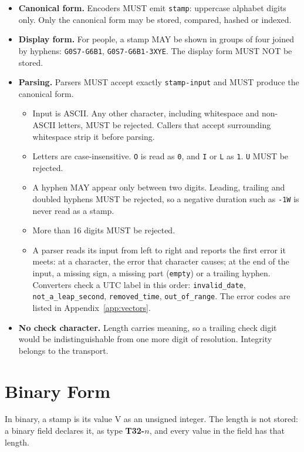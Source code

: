 \documentclass[11pt]{article}
\newcommand{\lit}[1]{\texttt{#1}}
\newcommand{\App}[1]{Appendix~\ref{#1}}
\begin{document}
\begin{itemize}
\item \textbf{Canonical form.} Encoders MUST emit \lit{stamp}: uppercase
alphabet digits only. Only the canonical form may be stored, compared, hashed
or indexed.
\item \textbf{Display form.} For people, a stamp MAY be shown in groups of
four joined by hyphens: \lit{G0S7-G6B1}, \lit{G0S7-G6B1-3XYE}. The display
form MUST NOT be stored.
\item \textbf{Parsing.} Parsers MUST accept exactly \lit{stamp-input} and MUST
produce the canonical form.
\begin{itemize}
\item Input is ASCII. Any other character, including whitespace and non-ASCII
letters, MUST be rejected. Callers that accept surrounding whitespace strip
it before parsing.
\item Letters are case-insensitive. \lit{O} is read as \lit{0}, and \lit{I} or
\lit{L} as \lit{1}. \lit{U} MUST be rejected.
\item A hyphen MAY appear only between two digits. Leading, trailing and
doubled hyphens MUST be rejected, so a negative duration such as \lit{-1W} is
never read as a stamp.
\item More than 16 digits MUST be rejected.
\item A parser reads its input from left to right and reports the first error
it meets: at a character, the error that character causes; at the end of the
input, a missing sign, a missing part (\lit{empty}) or a trailing hyphen.
Converters check a UTC label in this order: \lit{invalid\_date},
\lit{not\_a\_leap\_second}, \lit{removed\_time}, \lit{out\_of\_range}.
The error codes are listed in \App{app:vectors}.
\end{itemize}
\item \textbf{No check character.} Length carries meaning, so a trailing check
digit would be indistinguishable from one more digit of resolution. Integrity
belongs to the transport.
\end{itemize}

\section{Binary Form}\label{sec:binary}

In binary, a stamp is its value V as an unsigned integer. The length is not
stored: a binary field declares it, as type \textbf{T32-$n$}, and every value
in the field has that length.
\end{document}
